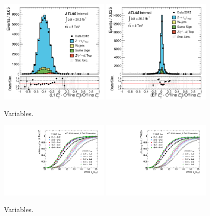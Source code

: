 \begin{figure}[tp]
  \centering
  \includegraphics[width=0.48\textwidth]{figures/PERF-2013-06_tmp/tau_trig_2012_resL1_pt}
  \includegraphics[width=0.48\textwidth]{figures/PERF-2013-06_tmp/tau_trig_2012_resEF_pt}
  \caption{Variables.}
  \label{fig:prospects-trigger-resolution}
\end{figure}

\begin{figure}[tp]
  \centering
  \includegraphics[width=0.48\textwidth]{figures/trigger/turnon_L1TAU20_1p3p}
  \includegraphics[width=0.48\textwidth]{figures/trigger/turnon_L1TAU20I_1p3p}
  \caption{Variables.}
  \label{fig:prospects-trigger-towersize}
\end{figure}

